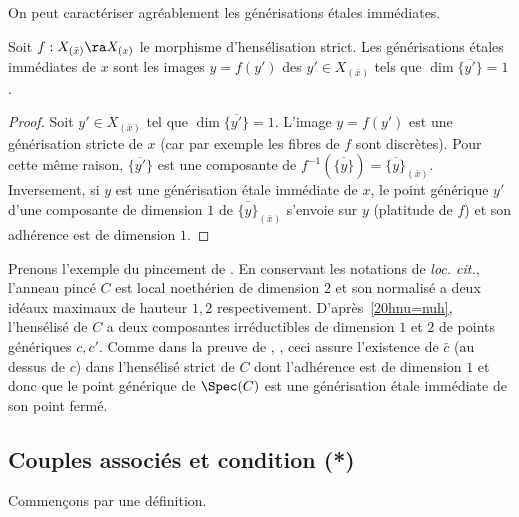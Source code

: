 \documentclass[10pt]{../fichiers-configuration-latex/smfart}
\begin{document}
On peut caractériser agréablement les générisations étales immédiates.


\begin{lemme2} Soit $f:X_{(\bar x)}\ra X_{(x)}$ le morphisme d'hensélisation strict. Les
générisations étales immédiates de $x$ sont les images $y=f(y')$ des $y'\in X_{(\bar x)}$ tels que
$\dim\overline{\{y'\}}=1$.\end{lemme2}




\begin{proof} Soit $y'\in X_{(\bar x)}$ tel que $\dim\overline{\{y'\}}=1$. L'image $y=f(y')$ est une
générisation stricte de $x$ (car par exemple les fibres de $f$ sont discrètes). Pour cette même
raison, $\overline{\{y'\}}$ est une composante de $f^{-1}(\overline{\{y\}})=\overline{\{y\}}_{(\bar
x)}$. Inversement, si $y$ est une générisation étale immédiate de $x$, le point générique $y'$ d'une
composante de dimension $1$ de $\overline{\{y\}}_{(\bar x)}$ s'envoie sur $y$ (platitude de $f$) et
son adhérence est de dimension $1$.\end{proof}




\begin{exemple2}Prenons l'exemple du pincement de . En conservant les
notations de \textit{loc. cit.}, l'anneau pincé $C$ est local noethérien de dimension $2$ et son
normalisé a deux idéaux maximaux de hauteur $1,2$ respectivement. D'après~\ref{20hnu=nuh},
l'hensélisé de $C$ a deux composantes irréductibles de dimension $1$ et $2$ de points génériques
$c,c'$. Comme dans la preuve de , , ceci assure l'existence de $\bar
c$ (au dessus de $c$) dans l'hensélisé strict de $C$ dont l'adhérence est de dimension $1$ et donc
que le point générique de $\Spec(C)$ est une générisation étale immédiate de son point
fermé.\end{exemple2}


\subsection{Couples associés et condition (*)}\label{20condstar} Commençons par une définition.
\end{document}

